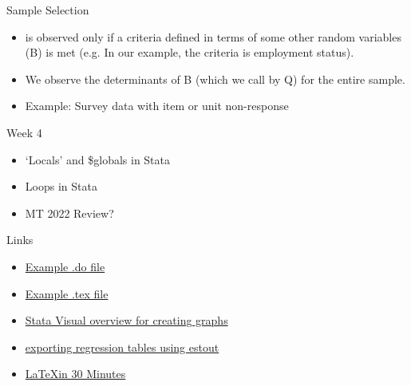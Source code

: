 \documentclass{beamer}
\begin{document}
\begin{frame}{Sample Selection}
\begin{itemize}
\item is observed only if a criteria defined in terms of some other random
 variables (B) is met (e.g. In our example, the criteria is employment status).
\item We observe the determinants of B (which we call by Q) for the entire 
sample.
\item Example: Survey data with item or unit non-response
\end{itemize}
\end{frame}


\begin{frame}{Week 4}
\begin{itemize}
\item `Locals' and \$globals in Stata
\item Loops in Stata
\item MT 2022 Review?
\end{itemize}
\end{frame}


\begin{frame}{Links}

\begin{itemize}
\item \href{https://github.com/mhdsh1/are256b-w24/blob/main/example.do}
{Example .do file} 
\item \href{https://github.com/mhdsh1/are256b-w24/blob/main/example.tex}
{Example .tex file}
\item \href{https://www.stata.com/support/faqs/graphics/gph/stata-graphs/}
{Stata Visual overview for creating graphs}
\item \href{https://repec.sowi.unibe.ch/stata/estout/index.html}
{exporting regression tables using estout}
\item \href{https://www.overleaf.com/learn/latex/Learn_LaTeX_in_30_minutes}
{\LaTeX in 30 Minutes}
\end{itemize}

\end{frame}
\end{document}
